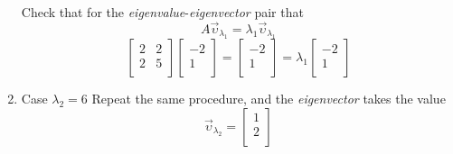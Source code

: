 \begin{remark}
\begin{enumerate}
            Check that for the \textit{eigenvalue}-\textit{eigenvector} pair that
            \begin{equation}
                A {\overrightarrow{\upsilon}}_{\lambda_1} = \lambda_1 {\overrightarrow{\upsilon}}_{\lambda_1}
            \end{equation}
            \begin{equation}
                \begin{bmatrix}
                    2 & 2 \\
                    2 & 5 \\
                \end{bmatrix}
                \begin{bmatrix}
                    -2 \\
                    1 \\
                \end{bmatrix}
                =
                \begin{bmatrix}
                    -2 \\
                    1 \\
                \end{bmatrix}
                =
                \lambda_1
                \begin{bmatrix}
                    -2 \\
                    1 \\
                \end{bmatrix}
            \end{equation}
        \item Case $\lambda_2 = 6$
            \subitem Repeat the same procedure, and the \textit{eigenvector} takes the value
            \begin{equation}
                {\overrightarrow{\upsilon}}_{\lambda_2}
                = 
                \begin{bmatrix}
                    1 \\
                    2 \\
                \end{bmatrix}
            \end{equation}
    \end{enumerate}
\end{remark}

